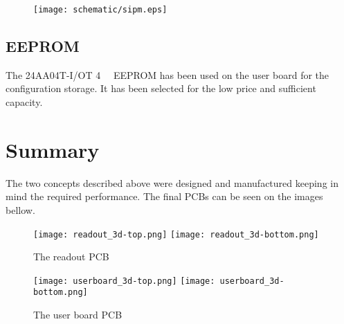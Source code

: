 \FloatBarrier
\begin{figure}[htp!]
    \centering
    \texttt{[image: schematic/sipm.eps]}
    \label{fig:sipm}
\end{figure}
\FloatBarrier

\subsection{EEPROM}
The 24AA04T-I/OT \SI{4}{\kilo\bit} EEPROM has been used on the user board for the configuration storage. It has been selected for the low price and sufficient capacity. 



\newpage
\section{Summary}
The two concepts described above were designed and manufactured keeping in mind the required performance. The final PCBs can be seen on the images bellow. 

\FloatBarrier
\begin{figure}[htp!]
    \centering
    \texttt{[image: readout\_3d-top.png]}
    \texttt{[image: readout\_3d-bottom.png]}
    \caption{The readout PCB}
    \label{fig:readout_3d}
\end{figure}
\FloatBarrier

\FloatBarrier
\begin{figure}[htp!]
    \centering
    \texttt{[image: userboard\_3d-top.png]}
    \hspace{2.2cm}
    \texttt{[image: userboard\_3d-bottom.png]}
    \caption{The user board PCB}
    \label{fig:userboard_3d}
\end{figure}
\FloatBarrier
